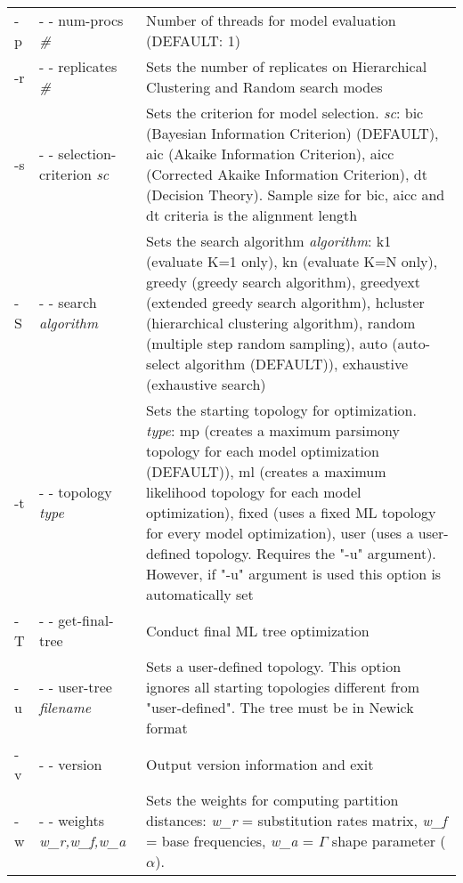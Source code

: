 \documentclass[11pt,twoside,a4paper]{article}
\begin{document}
\begin{flushleft}
{\begin{tabular}{@{}llp{.7\linewidth}@{}}
-p& - - num-procs {\it \#}
  &     Number of threads for model evaluation (DEFAULT: 1) \\

-r& - - replicates {\it \#}
  &     Sets the number of replicates on Hierarchical Clustering and Random search modes \\

-s& - - selection-criterion {\it sc}
  &     Sets the criterion for model selection. {\it sc}: bic (Bayesian Information Criterion) (DEFAULT), aic (Akaike Information Criterion), aicc (Corrected Akaike Information  Criterion),  dt
(Decision Theory). Sample size for bic, aicc and dt criteria is the alignment length \\

-S& - - search {\it algorithm}
  &     Sets  the  search  algorithm  {\it algorithm}:  k1  (evaluate K=1 only), kn (evaluate K=N only), greedy (greedy search algorithm), greedyext (extended greedy search algorithm), hcluster
(hierarchical clustering algorithm), random (multiple step random sampling), auto (auto-select algorithm (DEFAULT)), exhaustive (exhaustive search) \\

-t& - - topology {\it type}
  &     Sets the starting topology for optimization. {\it type}: mp (creates a maximum parsimony topology for each model optimization (DEFAULT)), ml (creates a maximum likelihood topology
for each model optimization), fixed (uses a fixed ML topology for every model optimization), user (uses a user-defined topology. Requires the "-u" argument). However, if "-u" argument is
used this option is automatically set \\

-T& - - get-final-tree
  &     Conduct final ML tree optimization \\

-u& - - user-tree {\it filename}
  &     Sets a user-defined topology. This option ignores all starting topologies different from "user-defined". The tree must be in Newick format \\

-v& - - version
  &     Output version information and exit \\
  
-w& - - weights {\it w\_r,w\_f,w\_a}
  &     Sets the weights for computing partition distances: 
  {\it w\_r} = substitution rates matrix, 
  {\it w\_f} = base frequencies,
  {\it w\_a} = $\Gamma$ shape parameter ($\alpha$). \\
\end{tabular}
}
\end{flushleft}
\end{document}
